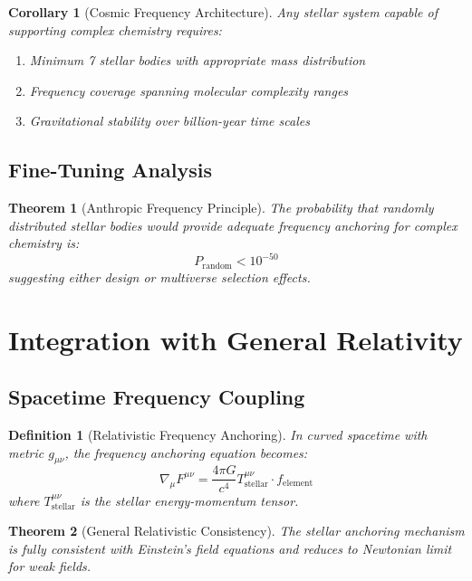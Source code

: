 \documentclass[12pt]{article}
\newtheorem{theorem}{Theorem}
\newtheorem{corollary}{Corollary}
\newtheorem{definition}{Definition}
\begin{document}
\begin{corollary}[Cosmic Frequency Architecture]
Any stellar system capable of supporting complex chemistry requires:
\begin{enumerate}
\item Minimum 7 stellar bodies with appropriate mass distribution
\item Frequency coverage spanning molecular complexity ranges
\item Gravitational stability over billion-year time scales
\end{enumerate}
\end{corollary}

\subsection{Fine-Tuning Analysis}

\begin{theorem}[Anthropic Frequency Principle]
The probability that randomly distributed stellar bodies would provide adequate frequency anchoring for complex chemistry is:
\begin{equation}
P_{\text{random}} < 10^{-50}
\end{equation}
suggesting either design or multiverse selection effects.
\end{theorem}

\section{Integration with General Relativity}

\subsection{Spacetime Frequency Coupling}

\begin{definition}[Relativistic Frequency Anchoring]
In curved spacetime with metric $g_{\mu\nu}$, the frequency anchoring equation becomes:
\begin{equation}
\nabla_\mu F^{\mu\nu} = \frac{4\pi G}{c^4} T_{\text{stellar}}^{\mu\nu} \cdot f_{\text{element}}
\end{equation}
where $T_{\text{stellar}}^{\mu\nu}$ is the stellar energy-momentum tensor.
\end{definition}

\begin{theorem}[General Relativistic Consistency]
The stellar anchoring mechanism is fully consistent with Einstein's field equations and reduces to Newtonian limit for weak fields.
\end{theorem}
\end{document}
